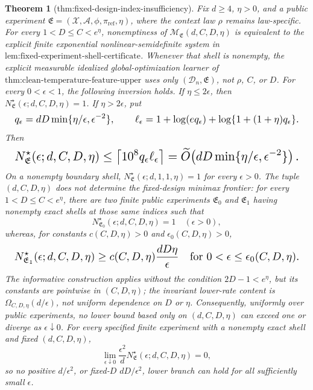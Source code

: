 \documentclass{article}
\newtheorem{theorem}{Theorem}
\begin{document}
\begin{theorem}[thm:fixed-design-index-insufficiency]\label{thm:fixed-design-index-insufficiency}
Fix \(d\ge4\), \(\eta>0\), and a public experiment \(\mathfrak E=(\mathcal X,\mathcal A,\phi,\pi_{\mathrm{ref}},\eta)\), where the context law \(\rho\) remains law-specific. For every \(1<D\le C<e^\eta\), nonemptiness of \(\mathcal M_{\mathfrak E}(d,C,D,\eta)\) is equivalent to the explicit finite exponential nonlinear-semidefinite system in \(\text{lem:fixed-experiment-shell-certificate}\). Whenever that shell is nonempty, the explicit measurable idealized global-optimization learner of \(\text{thm:clean-temperature-feature-upper}\) uses only \((\mathcal D_n,\mathfrak E)\), not \(\rho\), \(C\), or \(D\). For every \(0<\epsilon<1\), the following inversion holds. If \(\eta\le2\epsilon\), then \(N^\star_{\mathfrak E}(\epsilon;d,C,D,\eta)=1\). If \(\eta>2\epsilon\), put
\[
\makebox[\linewidth][c]{\resizebox{0.98\linewidth}{!}{\(\displaystyle q_\epsilon=dD\min\{\eta/\epsilon,\epsilon^{-2}\},
\qquad
\ell_\epsilon=1+\log(eq_\epsilon)+\log\{1+(1+\eta)q_\epsilon\}.\)}}
\]
Then
\[
\makebox[\linewidth][c]{\resizebox{0.98\linewidth}{!}{\(\displaystyle N^\star_{\mathfrak E}(\epsilon;d,C,D,\eta)
\le\left\lceil10^8q_\epsilon\ell_\epsilon\right\rceil
=\widetilde O\!\left(dD\min\{\eta/\epsilon,\epsilon^{-2}\}\right).\)}}
\]
On a nonempty boundary shell, \(N^\star_{\mathfrak E}(\epsilon;d,1,1,\eta)=1\) for every \(\epsilon>0\). The tuple \((d,C,D,\eta)\) does not determine the fixed-design minimax frontier: for every \(1<D\le C<e^\eta\), there are two finite public experiments \(\mathfrak E_0\) and \(\mathfrak E_1\) having nonempty exact shells at those same indices such that
\[
N^\star_{\mathfrak E_0}(\epsilon;d,C,D,\eta)=1\quad(\epsilon>0),
\]
whereas, for constants \(c(C,D,\eta)>0\) and \(\epsilon_0(C,D,\eta)>0\),
\[
\makebox[\linewidth][c]{\resizebox{0.98\linewidth}{!}{\(\displaystyle N^\star_{\mathfrak E_1}(\epsilon;d,C,D,\eta)\ge c(C,D,\eta)\frac{dD\eta}{\epsilon}
\quad\text{for }0<\epsilon\le\epsilon_0(C,D,\eta).\)}}
\]
The informative construction applies without the condition \(2D-1<e^\eta\), but its constants are pointwise in \((C,D,\eta)\); the invariant lower-rate content is \(\Omega_{C,D,\eta}(d/\epsilon)\), not uniform dependence on \(D\) or \(\eta\). Consequently, uniformly over public experiments, no lower bound based only on \((d,C,D,\eta)\) can exceed one or diverge as \(\epsilon\downarrow0\). For every specified finite experiment with a nonempty exact shell and fixed \((d,C,D,\eta)\),
\[
\lim_{\epsilon\downarrow0}\frac{\epsilon^2}{d}N^\star_{\mathfrak E}(\epsilon;d,C,D,\eta)=0,
\]
so no positive \(d/\epsilon^2\), or fixed-\(D\) \(dD/\epsilon^2\), lower branch can hold for all sufficiently small \(\epsilon\).
\end{theorem}
\end{document}
